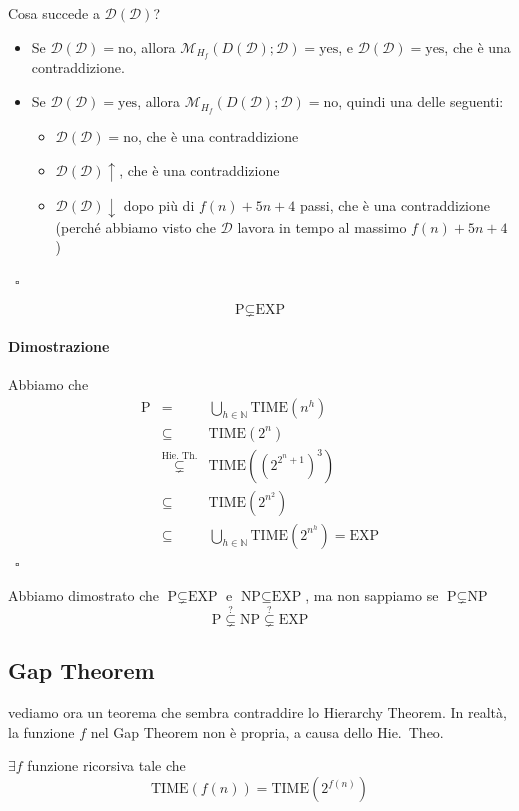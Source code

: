 \noindent Cosa succede a $\mathcal{D}(\mathcal{D})$?
\begin{itemize}
    \item Se $\mathcal{D}(\mathcal{D})=\text{no}$, allora $\mathcal{M}_{H_f}(D(\mathcal{D});\mathcal{D})=\text{yes}$, e $\mathcal{D}(\mathcal{D})=\text{yes}$, che è una contraddizione.
    \item Se $\mathcal{D}(\mathcal{D})=\text{yes}$, allora $\mathcal{M}_{H_f}(D(\mathcal{D});\mathcal{D})=\text{no}$, quindi una delle seguenti:
    \begin{itemize}
        \item $\mathcal{D}(\mathcal{D})=\text{no}$, che è una contraddizione
        \item $\mathcal{D}(\mathcal{D})\uparrow$, che è una contraddizione
        \item $\mathcal{D}(\mathcal{D})\downarrow$ dopo più di $f(n)+5n+4$ passi, che è una contraddizione (perché abbiamo visto che $\mathcal{D}$ lavora in tempo al massimo $f(n)+5n+4$)
    \end{itemize}
\end{itemize}
~\hfill $\square$

\begin{corollary}
    $$
        \text{P}\subsetneq\text{EXP}
    $$
\end{corollary}
\paragraph{Dimostrazione} Abbiamo che
\begin{eqnarray*}
    \text{P} &=& \bigcup_{h\in\mathbb{N}}\text{TIME}\left(n^h\right)\\
    &\subseteq& \text{TIME}(2^n)\\
    &\overset{\text{Hie.~Th.}}{\subsetneq}& \text{TIME}\left(\left(2^{2^n+1}\right)^3\right)\\
    &\subseteq& \text{TIME}\left(2^{n^2}\right)\\
    &\subseteq& \bigcup_{h\in\mathbb{N}}\text{TIME}\left(2^{n^h}\right) = \text{EXP}
\end{eqnarray*}
~\hfill $\square$\medskip

Abbiamo dimostrato che $\text{P}\subsetneq\text{EXP}$ e $\text{NP}\subseteq\text{EXP}$, ma non sappiamo se $\text{P}\subsetneq\text{NP}$
$$
    \text{P} \overset{?}{\subsetneq} \text{NP} \overset{?}{\subsetneq} \text{EXP}
$$


\subsection{Gap Theorem}
vediamo ora un teorema che sembra contraddire lo Hierarchy Theorem. In realtà, la funzione $f$ nel Gap Theorem non è propria, a causa dello Hie.~Theo.
\begin{theorem}
    $\exists f$ funzione ricorsiva tale che 
    $$
        \text{TIME}(f(n)) = \text{TIME}(2^{f(n)})
    $$
\end{theorem}
